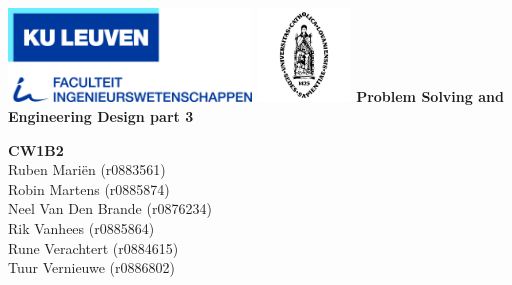 \begin{titlepage}
    \newpage
    \thispagestyle{empty}
    \frenchspacing
    \hspace{-0.2cm}
    \hspace{0.2cm}
    \hspace{0.2cm}
    \includegraphics[height=2.5cm]{images/logoFirW.jpg}
    \hspace{5.8cm}
    \includegraphics[height=2.5cm]{images/kul_logo.jpg}
    \vfill
    \vspace{0.5cm}
    \centering\Large{\rm\textbf{{Problem Solving and Engineering Design part 3}}}
    \vspace*{0.5cm}\vfill
    \begin{center}
        \begin{minipage}[t]{\textwidth}
            \begin{center}
                \Large{\rm{\textbf{CW1B2}}}\\
                \vspace{0.3cm}
                \normalsize{\rm {Ruben Mariën (r0883561)}}\\
                {\rm {Robin Martens (r0885874)}}\\
                {\rm {Neel Van Den Brande (r0876234)}}\\
                {\rm {Rik Vanhees (r0885864)}}\\
                {\rm {Rune Verachtert (r0884615)}}\\
                {\rm {Tuur Vernieuwe (r0886802)}}\\
                \vspace{2.5cm}
                

\end{center}
\end{minipage}
\end{center}
\end{titlepage}
